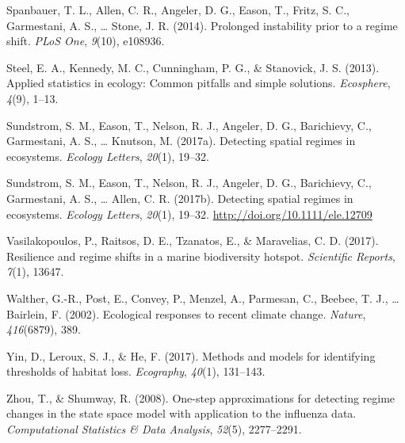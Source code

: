 \documentclass[12pt,twoside,openany]{reedthesis}
\begin{document}
\leavevmode\hypertarget{ref-spanbauer_prolonged_2014}{}%
Spanbauer, T. L., Allen, C. R., Angeler, D. G., Eason, T., Fritz, S. C., Garmestani, A. S., \ldots{} Stone, J. R. (2014). Prolonged instability prior to a regime shift. \emph{PLoS One}, \emph{9}(10), e108936.

\leavevmode\hypertarget{ref-steel2013applied}{}%
Steel, E. A., Kennedy, M. C., Cunningham, P. G., \& Stanovick, J. S. (2013). Applied statistics in ecology: Common pitfalls and simple solutions. \emph{Ecosphere}, \emph{4}(9), 1--13.

\leavevmode\hypertarget{ref-sundstrom_detecting_2017}{}%
Sundstrom, S. M., Eason, T., Nelson, R. J., Angeler, D. G., Barichievy, C., Garmestani, A. S., \ldots{} Knutson, M. (2017a). Detecting spatial regimes in ecosystems. \emph{Ecology Letters}, \emph{20}(1), 19--32.

\leavevmode\hypertarget{ref-sundstrom2017detecting}{}%
Sundstrom, S. M., Eason, T., Nelson, R. J., Angeler, D. G., Barichievy, C., Garmestani, A. S., \ldots{} Allen, C. R. (2017b). Detecting spatial regimes in ecosystems. \emph{Ecology Letters}, \emph{20}(1), 19--32. \url{http://doi.org/10.1111/ele.12709}

\leavevmode\hypertarget{ref-vasilakopoulos2017resilience}{}%
Vasilakopoulos, P., Raitsos, D. E., Tzanatos, E., \& Maravelias, C. D. (2017). Resilience and regime shifts in a marine biodiversity hotspot. \emph{Scientific Reports}, \emph{7}(1), 13647.

\leavevmode\hypertarget{ref-walther_ecological_2002}{}%
Walther, G.-R., Post, E., Convey, P., Menzel, A., Parmesan, C., Beebee, T. J., \ldots{} Bairlein, F. (2002). Ecological responses to recent climate change. \emph{Nature}, \emph{416}(6879), 389.

\leavevmode\hypertarget{ref-yin2017methods}{}%
Yin, D., Leroux, S. J., \& He, F. (2017). Methods and models for identifying thresholds of habitat loss. \emph{Ecography}, \emph{40}(1), 131--143.

\leavevmode\hypertarget{ref-zhou2008one}{}%
Zhou, T., \& Shumway, R. (2008). One-step approximations for detecting regime changes in the state space model with application to the influenza data. \emph{Computational Statistics \& Data Analysis}, \emph{52}(5), 2277--2291.
\end{document}
